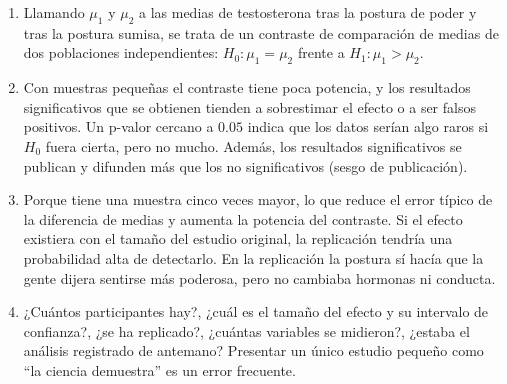 \documentclass[
  spanish,
  a4paper,
]{scrreport}
\theoremstyle{definition}
\theoremstyle{remark}
\begin{document}
\begin{tcolorbox}[enhanced jigsaw, arc=.35mm, bottomrule=.15mm, bottomtitle=1mm, breakable, colback=white, colbacktitle=quarto-callout-tip-color!10!white, colframe=quarto-callout-tip-color-frame, coltitle=black, left=2mm, leftrule=.75mm, opacityback=0, opacitybacktitle=0.6, rightrule=.15mm, title=\textcolor{quarto-callout-tip-color}{\faLightbulb}\hspace{0.5em}{Solución}, titlerule=0mm, toprule=.15mm, toptitle=1mm]

\begin{enumerate}
\def\labelenumi{\alph{enumi}.}
\item
  Llamando \(\mu_1\) y \(\mu_2\) a las medias de testosterona tras la
  postura de poder y tras la postura sumisa, se trata de un contraste de
  comparación de medias de dos poblaciones independientes:
  \(H_0: \mu_1=\mu_2\) frente a \(H_1: \mu_1>\mu_2\).
\item
  Con muestras pequeñas el contraste tiene poca potencia, y los
  resultados significativos que se obtienen tienden a sobrestimar el
  efecto o a ser falsos positivos. Un p-valor cercano a \(0.05\) indica
  que los datos serían algo raros si \(H_0\) fuera cierta, pero no
  mucho. Además, los resultados significativos se publican y difunden
  más que los no significativos (sesgo de publicación).
\item
  Porque tiene una muestra cinco veces mayor, lo que reduce el error
  típico de la diferencia de medias y aumenta la potencia del contraste.
  Si el efecto existiera con el tamaño del estudio original, la
  replicación tendría una probabilidad alta de detectarlo. En la
  replicación la postura sí hacía que la gente dijera sentirse más
  poderosa, pero no cambiaba hormonas ni conducta.
\item
  ¿Cuántos participantes hay?, ¿cuál es el tamaño del efecto y su
  intervalo de confianza?, ¿se ha replicado?, ¿cuántas variables se
  midieron?, ¿estaba el análisis registrado de antemano? Presentar un
  único estudio pequeño como ``la ciencia demuestra'' es un error
  frecuente.
\end{enumerate}

\end{tcolorbox}
\end{document}
